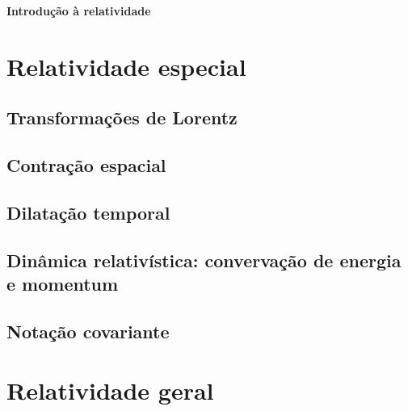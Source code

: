 \documentclass[12pt,a4paper,titlepage,brazil]{article}
\begin{document}
\begin{center}
 \LARGE{\bf Introdução à relatividade}
\end{center}


\section{Relatividade especial}


\subsection{Transformações de Lorentz}


\subsection{Contração espacial}


\subsection{Dilatação temporal}


\subsection{Dinâmica relativística: convervação de energia e momentum}


\subsection{Notação covariante}


\section{Relatividade geral}
\end{document}
